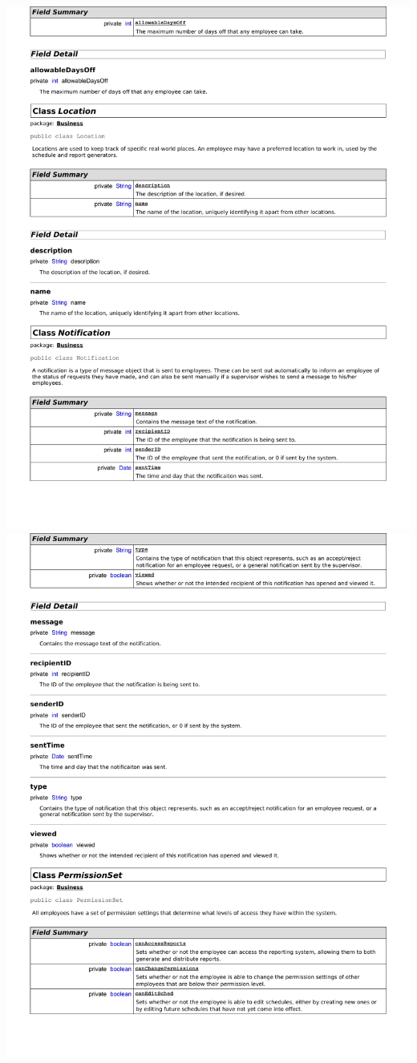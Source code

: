 \documentclass[letterpaper,12pt]{report}
\begin{document}
\newpage
\includegraphics[scale=0.9,trim=20mm 30mm 25mm 0mm]{externals/db4.pdf}
\newpage
\includegraphics[scale=0.9,trim=20mm 30mm 25mm 8mm]{externals/db5.pdf}
\end{document}
